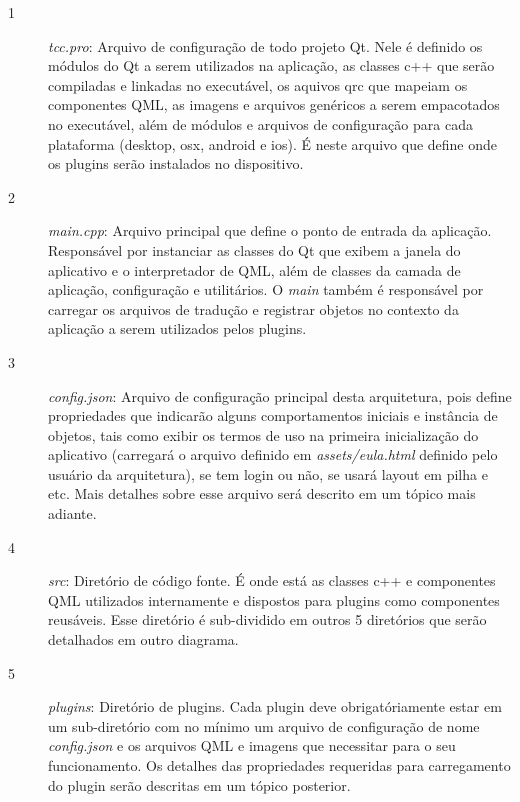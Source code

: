 \begin{description}

	\item[1] \textit{tcc.pro}: Arquivo de configuração de todo projeto Qt. Nele é definido os módulos do Qt a serem utilizados na aplicação, as classes c++ que serão compiladas e linkadas no executável, os aquivos qrc que mapeiam os componentes QML, as imagens e arquivos genéricos a serem empacotados no executável, além de módulos e arquivos de configuração para cada plataforma (desktop, osx, android e ios). É neste arquivo que define onde os plugins serão instalados no dispositivo.

	\item[2] \textit{main.cpp}: Arquivo principal que define o ponto de entrada da aplicação. Responsável por instanciar as classes do Qt que exibem a janela do aplicativo e o interpretador de QML, além de classes da camada de aplicação, configuração e utilitários. O \textit{main} também é responsável por carregar os arquivos de tradução e registrar objetos no contexto da aplicação a serem utilizados pelos plugins.

	\item[3] \textit{config.json}: Arquivo de configuração principal desta arquitetura, pois define propriedades que indicarão alguns comportamentos iniciais e instância de objetos, tais como exibir os termos de uso na primeira inicialização do aplicativo (carregará o arquivo definido em \textit{assets/eula.html} definido pelo usuário da arquitetura), se tem login ou não, se usará layout em pilha e etc. Mais detalhes sobre esse arquivo será descrito em um tópico mais adiante.

	\item[4] \textit{src}: Diretório de código fonte. É onde está as classes c++ e componentes QML utilizados internamente e dispostos para plugins como componentes reusáveis. Esse diretório é sub-dividido em outros 5 diretórios que serão detalhados em outro diagrama.

	\item[5] \textit{plugins}: Diretório de plugins. Cada plugin deve obrigatóriamente estar em um sub-diretório com no mínimo um arquivo de configuração de nome \textit{config.json} e os arquivos QML e imagens que necessitar para o seu funcionamento. Os detalhes das propriedades requeridas para carregamento do plugin serão descritas em um tópico posterior.


\end{description}
